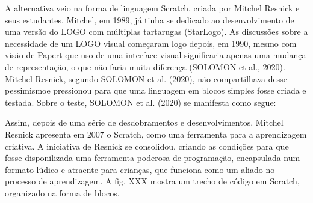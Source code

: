 \documentclass[
12pt,		%
openright,	%
twoside,  %
a4paper,			%
chapter=TITLE,		%
english,			%
french,				%
spanish,			%
brazil				%
]{USPSC-classe/USPSC}
\begin{document}
A alternativa veio na forma de linguagem Scratch, criada por Mitchel Resnick e seus estudantes. Mitchel, em 1989, j\'a tinha se dedicado ao desenvolvimento de uma vers\~ao do LOGO com m\'ultiplas tartarugas (StarLogo). As discuss\~oes sobre a necessidade de um LOGO visual come\c{c}aram logo depois, em 1990, mesmo com vis\~ao de Papert que uso de uma interface visual significaria apenas uma mudan\c{c}a de representa\c{c}\~ao, o que n\~ao faria muita diferen\c{c}a   (SOLOMON et al., 2020). Mitchel Resnick, segundo  SOLOMON et al. (2020), \textquotedbl n\~ao compartilhava desse pessimismo\textquotedbl  e pressionou para que uma linguagem em blocos simples fosse criada e testada. Sobre o teste,  SOLOMON et al. (2020) se manifesta como segue:


















\noindent\begin{center}\mbox{\centering{}}\end{center}


Assim, depois de uma s\'erie de desdobramentos e desenvolvimentos, Mitchel Resnick apresenta em 2007 o Scratch, como uma ferramenta para a aprendizagem criativa. A iniciativa de Resnick se consolidou, criando as condi\c{c}\~oes para que fosse disponilizada uma ferramenta poderosa de programa\c{c}\~ao, encapsulada num formato l\'udico e atraente para crian\c{c}as, que funciona como um aliado no processo de aprendizagem. A fig. XXX mostra um trecho de c\'odigo em Scratch, organizado na forma de blocos.
\end{document}
